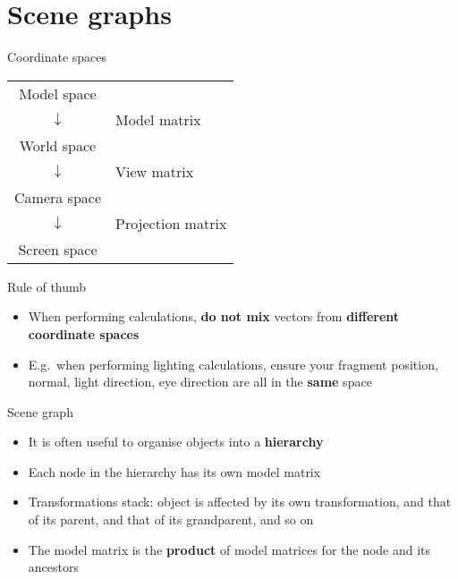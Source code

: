 \part{Scene graphs}
\frame{\partpage}

\begin{frame}{Coordinate spaces}
	\begin{center}
		\begin{tabular}{cl}
			\pause Model space \\
			\pause $\downarrow$ & Model matrix \\
			\pause World space \\
			\pause $\downarrow$ & View matrix \\
			\pause Camera space \\
			\pause $\downarrow$ & Projection matrix \\
			\pause Screen space
		\end{tabular}
	\end{center}
\end{frame}

\begin{frame}{Rule of thumb}
	\begin{itemize}
		\pause\item When performing calculations, \textbf{do not mix} vectors from \textbf{different coordinate spaces}
		\pause\item E.g.\ when performing lighting calculations, ensure your fragment position, normal, light direction, eye direction are all
			in the \textbf{same} space
	\end{itemize}
\end{frame}

\begin{frame}{Scene graph}
	\begin{itemize}
		\pause\item It is often useful to organise objects into a \textbf{hierarchy}
		\pause\item Each node in the hierarchy has its own model matrix
		\pause\item Transformations stack: object is affected by its own transformation,
			and that of its parent,
			and that of its grandparent,
			and so on
		\pause\item The model matrix is the \textbf{product} of model matrices for the node and its ancestors
	\end{itemize}
\end{frame}
